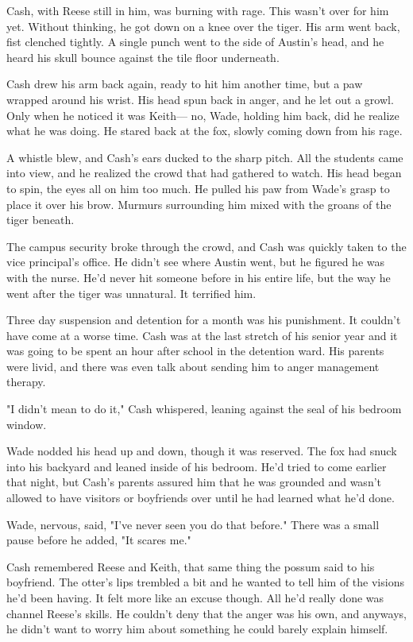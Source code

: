 Cash, with Reese still in him, was burning with rage. This wasn't over for him yet. Without thinking, he got down on a knee over the tiger. His arm went back, fist clenched tightly. A single punch went to the side of Austin's head, and he heard his skull bounce against the tile floor underneath.

Cash drew his arm back again, ready to hit him another time, but a paw wrapped around his wrist. His head spun back in anger, and he let out a growl. Only when he noticed it was Keith--- no, Wade, holding him back, did he realize what he was doing. He stared back at the fox, slowly coming down from his rage.

A whistle blew, and Cash's ears ducked to the sharp pitch. All the students came into view, and he realized the crowd that had gathered to watch. His head began to spin, the eyes all on him too much. He pulled his paw from Wade's grasp to place it over his brow. Murmurs surrounding him mixed with the groans of the tiger beneath.

The campus security broke through the crowd, and Cash was quickly taken to the vice principal's office. He didn't see where Austin went, but he figured he was with the nurse. He'd never hit someone before in his entire life, but the way he went after the tiger was unnatural. It terrified him.

Three day suspension and detention for a month was his punishment. It couldn't have come at a worse time. Cash was at the last stretch of his senior year and it was going to be spent an hour after school in the detention ward. His parents were livid, and there was even talk about sending him to anger management therapy.

"I didn't mean to do it," Cash whispered, leaning against the seal of his bedroom window.

Wade nodded his head up and down, though it was reserved. The fox had snuck into his backyard and leaned inside of his bedroom. He'd tried to come earlier that night, but Cash's parents assured him that he was grounded and wasn't allowed to have visitors or boyfriends over until he had learned what he'd done.

Wade, nervous, said, "I've never seen you do that before." There was a small pause before he added, "It scares me."

Cash remembered Reese and Keith, that same thing the possum said to his boyfriend. The otter's lips trembled a bit and he wanted to tell him of the visions he'd been having. It felt more like an excuse though. All he'd really done was channel Reese's skills. He couldn't deny that the anger was his own, and anyways, he didn't want to worry him about something he could barely explain himself.

